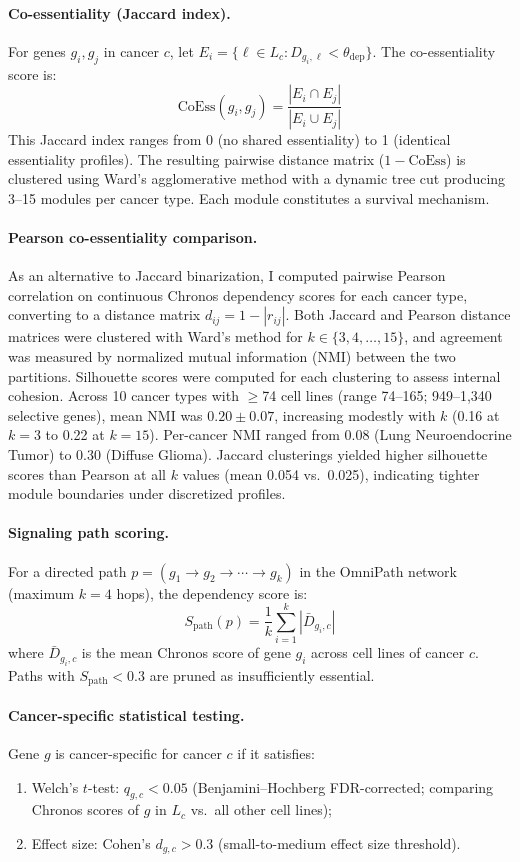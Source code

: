 \documentclass[11pt]{article}
\begin{document}
\paragraph{Co-essentiality (Jaccard index).} For genes $g_i, g_j$ in cancer $c$, let $E_i = \{\ell \in L_c : D_{g_i,\ell} < \theta_{\text{dep}}\}$. The co-essentiality score is:
\[
\text{CoEss}(g_i, g_j) = \frac{|E_i \cap E_j|}{|E_i \cup E_j|}
\]
This Jaccard index ranges from 0 (no shared essentiality) to 1 (identical essentiality profiles). The resulting pairwise distance matrix ($1 - \text{CoEss}$) is clustered using Ward's agglomerative method with a dynamic tree cut producing 3--15 modules per cancer type. Each module constitutes a survival mechanism.

\paragraph{Pearson co-essentiality comparison.} As an alternative to Jaccard binarization, I computed pairwise Pearson correlation on continuous Chronos dependency scores for each cancer type, converting to a distance matrix $d_{ij} = 1 - |r_{ij}|$. Both Jaccard and Pearson distance matrices were clustered with Ward's method for $k \in \{3, 4, \ldots, 15\}$, and agreement was measured by normalized mutual information (NMI) between the two partitions. Silhouette scores were computed for each clustering to assess internal cohesion. Across 10 cancer types with $\geq$74 cell lines (range 74--165; 949--1,340 selective genes), mean NMI was $0.20 \pm 0.07$, increasing modestly with $k$ (0.16 at $k{=}3$ to 0.22 at $k{=}15$). Per-cancer NMI ranged from 0.08 (Lung Neuroendocrine Tumor) to 0.30 (Diffuse Glioma). Jaccard clusterings yielded higher silhouette scores than Pearson at all $k$ values (mean 0.054 vs.\ 0.025), indicating tighter module boundaries under discretized profiles.

\paragraph{Signaling path scoring.} For a directed path $p = (g_1 \to g_2 \to \cdots \to g_k)$ in the OmniPath network (maximum $k = 4$ hops), the dependency score is:
\[
S_{\text{path}}(p) = \frac{1}{k} \sum_{i=1}^{k} |\bar{D}_{g_i,c}|
\]
where $\bar{D}_{g_i,c}$ is the mean Chronos score of gene $g_i$ across cell lines of cancer $c$. Paths with $S_{\text{path}} < 0.3$ are pruned as insufficiently essential.

\paragraph{Cancer-specific statistical testing.} Gene $g$ is cancer-specific for cancer $c$ if it satisfies:
\begin{enumerate}
\item Welch's $t$-test: $q_{g,c} < 0.05$ (Benjamini--Hochberg FDR-corrected; comparing Chronos scores of $g$ in $L_c$ vs.\ all other cell lines);
\item Effect size: Cohen's $d_{g,c} > 0.3$ (small-to-medium effect size threshold).
\end{enumerate}
\end{document}
